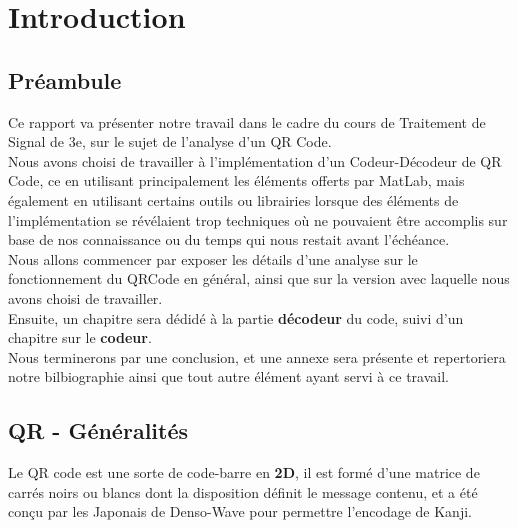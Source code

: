 \documentclass{report}
\title{}
\author{Jonathan \bsc{Seynaeve}, Nicolas \bsc{Sias}, Youri \bsc{Mouton}, Samuel \bsc{Monroe}}
\date{30 Mai 2015}
\begin{document}
\maketitle

\newpage
\thispagestyle{empty}
\mbox{}

\tableofcontents

\chapter{Introduction}

	\section{Préambule}

		Ce rapport va présenter notre travail dans le cadre du cours de Traitement de Signal de 3e, sur le sujet de l'analyse d'un QR Code.\\

		Nous avons choisi de travailler à l'implémentation d'un Codeur-Décodeur de QR Code, ce en utilisant principalement les éléments offerts par MatLab, mais également en utilisant certains outils ou librairies lorsque des éléments de l'implémentation se révélaient trop techniques où ne pouvaient être accomplis sur base de nos connaissance ou du temps qui nous restait avant l'échéance.\\

		Nous allons commencer par exposer les détails d'une analyse sur le fonctionnement du QRCode en général, ainsi que sur la version avec laquelle nous avons choisi de travailler.\\
		Ensuite, un chapitre sera dédidé à la partie \textbf{décodeur} du code, suivi d'un chapitre sur le \textbf{codeur}.\\
		Nous terminerons par une conclusion, et une annexe sera présente et repertoriera notre bilbiographie ainsi que tout autre élément ayant servi à ce travail.\\

	\section{QR - Généralités}

		Le QR code est une sorte de code-barre en \textbf{2D}, il est formé d'une matrice de carrés noirs ou blancs dont la disposition définit le message contenu, et a été conçu par les Japonais de Denso-Wave pour permettre l'encodage de Kanji.\\
\end{document}
